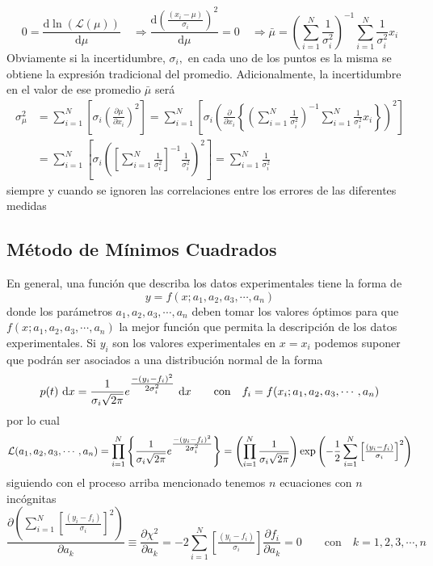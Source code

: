 \documentclass[spanish,titlepage,11pt]{article}
\begin{document}
\[
0=\frac{\mathrm{d\ln}\left(  \mathcal{L}(\mu)\right)  }{\mathrm{d}\mu}%
\quad\Rightarrow\frac{\mathrm{d}\left(  \tfrac{\left(  x_{i}-\mu\right)
}{\sigma_{i}}\right)  ^{2}}{\mathrm{d}\mu}=0\quad\Rightarrow\bar{\mu}=\left(
\sum_{i=1}^{N}\frac{1}{\sigma_{i}^{2}}\right)  ^{-1}\sum_{i=1}^{N}\frac
{1}{\sigma_{i}^{2}}x_{i}%
\]
Obviamente si la incertidumbre, $\sigma_{i},$ en cada uno de los puntos es la
misma se obtiene la expresi\'{o}n tradicional del promedio. Adicionalmente, la
incertidumbre en el valor de ese promedio $\bar{\mu}$ ser\'{a}
\begin{align*}
\sigma_{\mu}^{2} &  =\sum_{i=1}^{N}\left[  \sigma_{i}\left(  \frac{\partial
\mu}{\partial x_{i}}\right)  ^{2}\right]  =\sum_{i=1}^{N}\left[  \sigma
_{i}\left(  \frac{\partial}{\partial x_{i}}\left\{  \left(  \sum_{i=1}%
^{N}\frac{1}{\sigma_{i}^{2}}\right)  ^{-1}\sum_{i=1}^{N}\frac{1}{\sigma
_{i}^{2}}x_{i}\right\}  \right)  ^{2}\right]  \\
&  =\sum_{i=1}^{N}\left[  \sigma_{i}\left(  \left[  \sum_{i=1}^{N}\frac
{1}{\sigma_{i}^{2}}\right]  ^{-1}\frac{1}{\sigma_{i}^{2}}\right)  ^{2}\right]
=\sum_{i=1}^{N}\frac{1}{\sigma_{i}^{2}}%
\end{align*}
siempre y cuando se ignoren las correlaciones entre los errores de las
diferentes medidas

\subsection{M\'{e}todo de M\'{i}nimos Cuadrados}

En general, una funci\'{o}n que describa los datos experimentales tiene la
forma de
\[
y=f(x;a_{1},a_{2},a_{3},\cdots,a_{n})
\]
donde los par\'{a}metros $a_{1},a_{2},a_{3},\cdots,a_{n}$ deben tomar los
valores \'{o}ptimos para que $f(x;a_{1},a_{2},a_{3},\cdots,a_{n})$ la mejor
funci\'{o}n que permita la descripci\'{o}n de los datos experimentales. Si
$y_{i}$ son los valores experimentales en $x=x_{i}$ podemos suponer que
podr\'{a}n ser asociados a una distribuci\'{o}n normal de la forma
\[
p(t)\ \mathrm{d}x=\frac{1}{\sigma_{i}\sqrt{2\pi}}{\Large e}^{\tfrac{-\left(
y_{i}-f_{i}\right)  ^{2}}{2\sigma_{i}^{2}}}\ \mathrm{d}x\qquad\mathrm{con\quad
}f_{i}=f(x_{i};a_{1},a_{2},a_{3},\cdots,a_{n})
\]
por lo cual
\[
\mathcal{L}(a_{1},a_{2},a_{3},\cdots,a_{n})=\prod_{i=1}^{N}\left\{  \frac
{1}{\sigma_{i}\sqrt{2\pi}}{\Large e}^{\tfrac{-\left(  y_{i}-f_{i}\right)
^{2}}{2\sigma_{i}^{2}}}\right\}  =\left(  \prod_{i=1}^{N}\frac{1}{\sigma
_{i}\sqrt{2\pi}}\right)  \exp\left(  -\frac{1}{2}\sum_{i=1}^{N}\left[
\tfrac{\left(  y_{i}-f_{i}\right)  }{\sigma_{i}}\right]  ^{2}\right)
\]
siguiendo con el proceso arriba mencionado tenemos $n$ ecuaciones con $n$
inc\'{o}gnitas
\[
\frac{\partial\left(  \sum_{i=1}^{N}\left[  \tfrac{\left(  y_{i}-f_{i}\right)
}{\sigma_{i}}\right]  ^{2}\right)  }{\partial a_{k}}\equiv\frac{\partial
\chi^{2}}{\partial a_{k}}=-2\sum_{i=1}^{N}\left[  \tfrac{\left(  y_{i}%
-f_{i}\right)  }{\sigma_{i}}\right]  \frac{\partial f_{i}}{\partial a_{k}%
}=0\qquad\mathrm{con\quad}k=1,2,3,\cdots,n
\]
\end{document}
